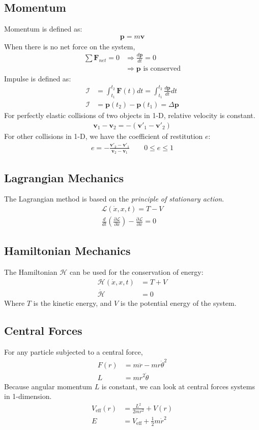 \documentclass[11pt, letterpaper]{article}
\newcommand{\Lagr}{\mathcal{L}}	       %
\newcommand{\Hami}{\mathcal{H}}	       %
\newcommand{\Imp}{\mathcal{I}}	       %
\newcommand{\ve}[1]{
  \ensuremath{\bm{#1}}}	               %
\newcommand{\pd}[2]{
  \ensuremath{
    \frac{\partial #1}{\partial #2} }} %
\begin{document}
\begin{multicols*}{3}
\subsection{Momentum}
Momentum is defined as:
\begin{align*}
  \ve{p} = m \ve{v}
\end{align*}
When there is no net force on the system,
\begin{align*}
  \sum \ve{F}_{net} = 0 &\Rightarrow \frac{d\ve{p}}{dt} = 0 \\
  &\Rightarrow \ve{p} \text{ is conserved}
\end{align*}
Impulse is defined as:
\begin{align*}
  \Imp &= \int_{t_1}^{t_2} \ve{F}(t) dt = \int_{t_1}^{t_2} \frac{d\ve{p}}{dt} dt \\
  \Imp &= \ve{p}(t_2) - \ve{p}(t_1) = \Delta \ve{p}
\end{align*}
For perfectly elastic collisions of two objects in 1-D, relative velocity is constant. 
\begin{align*}
  \ve{v}_1 - \ve{v}_2 = - (\ve{v}'_1 - \ve{v}'_2)
\end{align*}
For other collisions in 1-D, we have the coefficient of restitution $e$:
\begin{align*}
  e = -\frac{\ve{v}'_2 - \ve{v}'_1}{\ve{v}_2 - \ve{v}_1} \qquad 0 \leq e \leq  1
\end{align*}
\subsection{Lagrangian Mechanics}
The Lagrangian method is based on the \emph{principle of stationary action}.
\begin{align*}
  \Lagr(\dot{x},x,t) = T - V \\
  \frac{d}{dt}\left( \pd{\Lagr}{\dot{x}} \right) - \pd{\Lagr}{x} = 0
\end{align*}
\subsection{Hamiltonian Mechanics}
The Hamiltonian $\Hami$ can be used for the conservation of energy:
\begin{align*}
  \Hami(\dot{x},x,t) &= T + V \\
  \dot{\Hami}&=0
\end{align*}
Where $T$ is the kinetic energy, and $V$ is the potential energy of the system.
\subsection{Central Forces}
For any particle subjected to a central force,
\begin{align*}
  F(r) &= m \ddot{r} - m r \dot{\theta}^2\\
  L &= mr^2\dot{\theta}
\end{align*}
Because angular momentum $L$ is constant, we can look at central forces systems in 1-dimension.
\begin{align*}
  V_{\text{eff}}(r) &= \frac{L^2}{2mr^2} + V(r) \\
  E &= V_{\text{eff}} + \frac{1}{2} m \dot{r}^2
\end{align*}

\end{multicols*}
\end{document}
